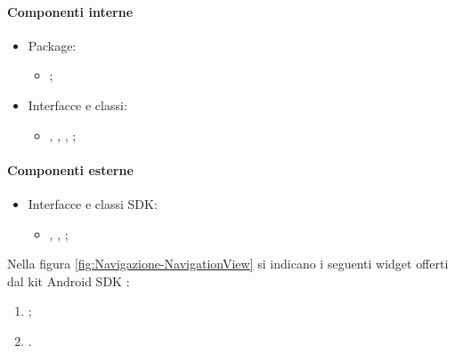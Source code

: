 \documentclass[../Funzionalita.tex]{subfiles}
\begin{document}
			\paragraph*{Componenti interne}
			\begin{itemize}
			
				\item Package:
				\begin{itemize}
					\item[] \view;
				\end{itemize}
				
				\item Interfacce e classi:
				\begin{itemize}
					\item[] \PoiCategoryView, \PoiCategoryViewImp, \NavigationView, \NavigationViewImp;
				\end{itemize}
				
			\end{itemize}
			
			
			\paragraph*{Componenti esterne}
			\begin{itemize}
				\item Interfacce e classi SDK:
				\begin{itemize}
					\item[] \AdapterView, \ArrayAdapter, \ListView;
				\end{itemize}
			\end{itemize}
			
			Nella figura \ref{fig:Navigazione-NavigationView} si indicano i seguenti widget offerti dal kit Android SDK :
			\begin{enumerate}
				\item \Toolbar;
				\item \ListView.
			\end{enumerate}
		
\end{document}
